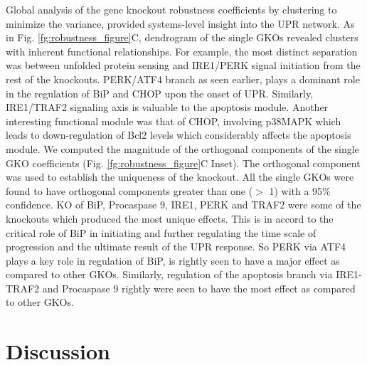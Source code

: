 \documentclass[fleqn,10pt]{wlscirep}
\begin{document}
Global analysis of the gene knockout robustness coefficients by clustering to minimize the variance, provided systems-level insight into the UPR network. As in Fig. \ref{fg:robustness_figure}C, dendrogram of the single GKOs revealed clusters with inherent functional relationships. For example, the most distinct separation was between unfolded protein sensing and IRE1/PERK signal initiation from the rest of the knockouts. PERK/ATF4 branch as seen earlier, plays a dominant role in the regulation of BiP and CHOP upon the onset of UPR. Similarly, IRE1/TRAF2 signaling axis is valuable to the apoptosis module. Another interesting functional module was that of CHOP, involving p38MAPK which leads to down-regulation of Bcl2 levels which considerably affects the apoptosis module. We computed the magnitude of the orthogonal components of the single GKO coefficients (Fig. \ref{fg:robustness_figure}C Inset). The orthogonal component was used to establish the uniqueness of the knockout. All the single GKOs were found to have orthogonal components greater than one ($>$ 1) with a 95\% confidence. KO of BiP, Procaspase 9, IRE1, PERK and TRAF2 were some of the knockouts which produced the most unique effects. This is in accord to the critical role of BiP in initiating and further regulating the time scale of progression and the ultimate result of the UPR response. So PERK via ATF4 plays a key role in regulation of BiP, is rightly seen to have a major effect as compared to other GKOs. Similarly, regulation of the apoptosis branch via IRE1-TRAF2 and Procaspase 9 rightly were seen to have the most effect as compared to other GKOs. 


\section*{Discussion}
\end{document}

